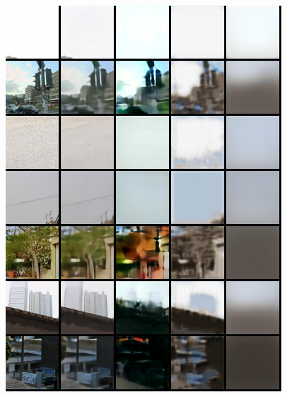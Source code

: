 \begin{appendices}
\begin{figure}
    \includegraphics[width=0.92\textwidth]{figures/ptz/train_stacked_1}
\end{figure}
\begin{figure}
    \centering

\end{figure}
\end{appendices}
